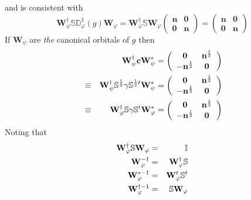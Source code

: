 \documentclass[aps,preprint]{revtex4}
\begin{document}
and is consistent with 
\begin{equation}
\mathbf{W}_{\varphi }^{\dagger }\mathbb{SD}_{\varphi }^{1}\left( g\right) 
\mathbf{W}_{\varphi }=\mathbf{W}_{\varphi }^{\dagger }\mathbb{S}\mathbf{W}%
_{\varphi }\left( 
\begin{array}{cc}
\mathbf{n} & \mathbf{0} \\ 
\mathbf{0} & \mathbf{n}%
\end{array}%
\right) =\left( 
\begin{array}{cc}
\mathbf{n} & \mathbf{0} \\ 
\mathbf{0} & \mathbf{n}%
\end{array}%
\right)
\end{equation}%
If $\mathbf{W}_{\psi }$ are \emph{the} canonical orbitals of $g$ then 
\begin{eqnarray}
&&\mathbf{W}_{\psi }^{\dagger }\mathbf{cW}_{\psi }^{\ast }=\left( 
\begin{array}{cc}
\mathbf{0} & \mathbf{n}^{\frac{1}{2}} \\ 
\mathbf{-n}^{\frac{1}{2}} & \mathbf{0}%
\end{array}%
\right)  \notag \\
&\equiv &\mathbf{W}_{\psi }^{\dagger }\mathbb{S}^{\frac{1}{2}}\mathbf{\gamma 
}\mathbb{S}^{\frac{1}{2}t}\mathbf{W}_{\psi }^{\ast }=\left( 
\begin{array}{cc}
\mathbf{0} & \mathbf{n}^{\frac{1}{2}} \\ 
\mathbf{-n}^{\frac{1}{2}} & \mathbf{0}%
\end{array}%
\right)  \notag \\
&\equiv &\mathbf{W}_{\varphi }^{\dagger }\mathbb{S}\mathbf{\gamma }\mathbb{S}%
^{t}\mathbf{W}_{\varphi }^{\ast }=\left( 
\begin{array}{cc}
\mathbf{0} & \mathbf{n}^{\frac{1}{2}} \\ 
\mathbf{-n}^{\frac{1}{2}} & \mathbf{0}%
\end{array}%
\right)
\end{eqnarray}%
Noting that 
\begin{eqnarray}
\mathbf{W}_{\varphi }^{\dagger }\mathbb{S}\mathbf{W}_{\varphi } &=&\mathbb{I}
\notag \\
\mathbf{W}_{\varphi }^{-1} &=&\mathbf{W}_{\varphi }^{\dagger }\mathbb{S} 
\notag \\
\mathbf{W}_{\varphi }^{\ast -1} &=&\mathbf{W}_{\varphi }^{t}\mathbb{S}^{t} 
\notag \\
\mathbf{W}_{\varphi }^{\dagger -1} &=&\mathbb{S}\mathbf{W}_{\varphi }
\end{eqnarray}%
\end{document}
